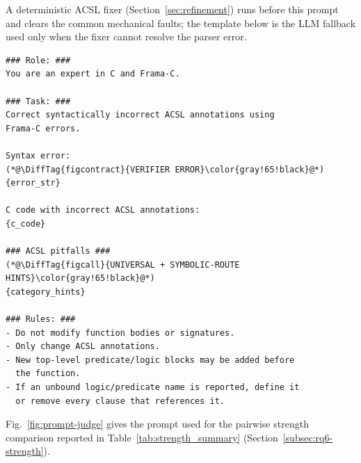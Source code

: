 
\DIFaddbegin
A deterministic ACSL fixer (Section~\ref{sec:refinement}) runs before this prompt and clears the common mechanical faults; the template below is the LLM fallback used only when the fixer cannot resolve the parser error.
\DIFaddend

\begin{tcolorbox}[promptboxcompact, title={Syntax-repair prompt}]
\begin{lstlisting}[style=PromptInnerCompact]
### Role: ###
You are an expert in C and Frama-C.

### Task: ###
Correct syntactically incorrect ACSL annotations using
Frama-C errors.

Syntax error:
(*@\DiffTag{figcontract}{VERIFIER ERROR}\color{gray!65!black}@*)
{error_str}

C code with incorrect ACSL annotations:
{c_code}

### ACSL pitfalls ###
(*@\DiffTag{figcall}{UNIVERSAL + SYMBOLIC-ROUTE HINTS}\color{gray!65!black}@*)
{category_hints}

### Rules: ###
- Do not modify function bodies or signatures.
- Only change ACSL annotations.
- New top-level predicate/logic blocks may be added before
  the function.
- If an unbound logic/predicate name is reported, define it
  or remove every clause that references it.
\end{lstlisting}
\end{tcolorbox}

\label{app:prompt-strength-judge}

\DIFaddbegin
Fig.~\ref{fig:prompt-judge} gives the prompt used for the pairwise strength comparison reported in Table~\ref{tab:strength_summary} (Section~\ref{subsec:rq6-strength}).
\DIFaddend

